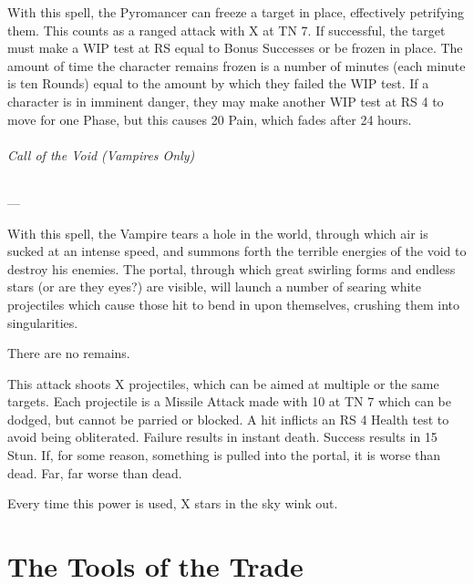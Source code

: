 \documentclass[oneside,11pt,english]{book}
\begin{document}
With this spell, the Pyromancer can freeze a target in place, effectively
petrifying them. This counts as a ranged attack with X at TN 7. If successful,
the target must make a WIP test at RS equal to Bonus Successes or be frozen in
place. The amount of time the character remains frozen is a number of minutes
(each minute is ten Rounds) equal to the amount by which they failed the WIP
test. If a character is in imminent danger, they may make another WIP test at RS
4 to move for one Phase, but this causes 20 Pain, which fades after 24 hours.

\paragraph{Call of the Void (Vampires Only)}
---\quad [20+X]

With this spell, the Vampire tears a hole in the world, through which air is
sucked at an intense speed, and summons forth the terrible energies of the void
to destroy his enemies. The portal, through which great swirling forms and
endless stars (or are they eyes?) are visible, will launch a number of searing
white projectiles which cause those hit to bend in upon themselves, crushing
them into singularities.

There are no remains. 

This attack shoots X projectiles, which can be aimed at multiple or the same
targets. Each projectile is a Missile Attack made with 10 at TN 7 which can be
dodged, but cannot be parried or blocked. A hit inflicts an RS 4 Health test to
avoid being obliterated. Failure results in instant death. Success results in 15
Stun. If, for some reason, something is pulled into the portal, it is worse than
dead. Far, far worse than dead.

Every time this power is used, X stars in the sky wink out. 

\part[Gear and Equipment]{The Tools of the Trade}
\end{document}
